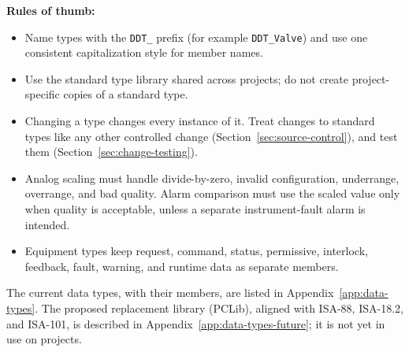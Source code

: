 \textbf{Rules of thumb:}
\begin{itemize}[itemsep=1pt]
  \item Name types with the \texttt{DDT\_} prefix (for example \texttt{DDT\_Valve}) and use one consistent capitalization style for member names.
  \item Use the standard type library shared across projects; do not create project-specific copies of a standard type.
  \item Changing a type changes every instance of it. Treat changes to standard types like any other controlled change (Section~\ref{sec:source-control}), and test them (Section~\ref{sec:change-testing}).
  \item Analog scaling must handle divide-by-zero, invalid configuration, underrange, overrange, and bad quality. Alarm comparison must use the scaled value only when quality is acceptable, unless a separate instrument-fault alarm is intended.
  \item Equipment types keep request, command, status, permissive, interlock, feedback, fault, warning, and runtime data as separate members.
\end{itemize}
The current data types, with their members, are listed in Appendix~\ref{app:data-types}. The proposed replacement library (PCLib), aligned with ISA-88, ISA-18.2, and ISA-101, is described in Appendix~\ref{app:data-types-future}; it is not yet in use on projects.

